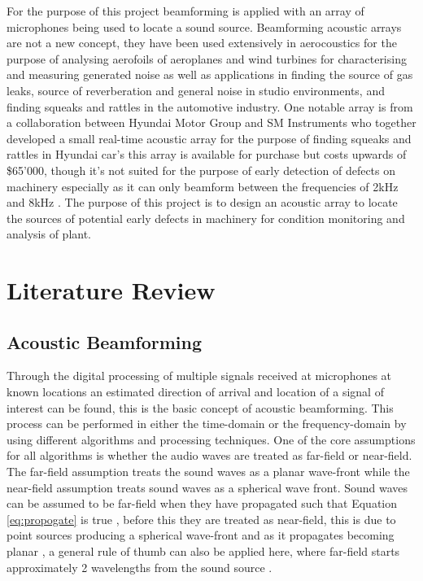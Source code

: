 \documentclass{UoNMCHA}
\numberwithin{equation}{section}
\begin{document}
    For the purpose of this project beamforming is applied with an array of microphones being used to locate a sound source. Beamforming acoustic arrays are not a new concept, they have been used extensively in aerocoustics for the purpose of analysing aerofoils of aeroplanes and wind turbines for characterising and measuring generated noise as well as applications in finding the source of gas leaks, source of reverberation and general noise in studio environments, and finding squeaks and rattles in the automotive industry. One notable array is from a collaboration between Hyundai Motor Group and SM Instruments who together developed a small real-time acoustic array for the purpose of finding squeaks and rattles in Hyundai car's this array is available for purchase but costs upwards of \$65'000, though it's not suited for the purpose of early detection of defects on machinery especially as it can only beamform between the frequencies of 2kHz and 8kHz \citep{Smi}. The purpose of this project is to design an acoustic array to locate the sources of potential early defects in machinery for condition monitoring and analysis of plant.
    
\newpage
\section{Literature Review} \label{sec:Literature Review}
\subsection{Acoustic Beamforming} \label{sec:Beamforming}
    Through the digital processing of multiple signals received at microphones at known locations an estimated direction of arrival and location of a signal of interest can be found, this is the basic concept of acoustic beamforming. This process can be performed in either the time-domain or the frequency-domain by using different algorithms and processing techniques. One of the core assumptions for all algorithms is whether the audio waves are treated as far-field or near-field. The far-field assumption treats the sound waves as a planar wave-front while the near-field assumption treats sound waves as a spherical wave front. Sound waves can be assumed to be far-field when they have propagated such that Equation \ref{eq:propogate} is true \citep{McC01}, before this they are treated as near-field, this is due to point sources producing a spherical wave-front and as it propagates becoming planar \citep{Yan05}, a general rule of thumb can also be applied here, where far-field starts approximately 2 wavelengths from the sound source \citep{Mac19}. 
    
\end{document}
